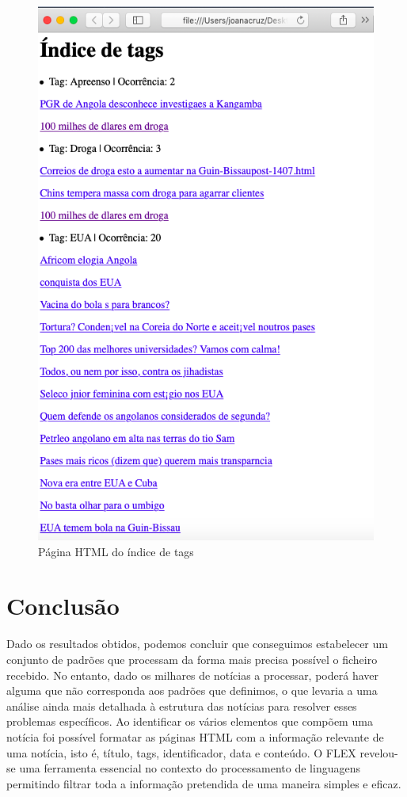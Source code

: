 \documentclass[25pt]{article}
\begin{document}
    \begin{figure}
    \centering\includegraphics[scale=0.50]{tagsHTML}
    \caption{\label{fig:controller}Página HTML do índice de tags}
    \end{figure}

    \newpage
    \newpage

    \section{Conclusão} 
    Dado os resultados obtidos, podemos concluir que conseguimos estabelecer um conjunto
    de padrões que processam da forma mais precisa possível o ficheiro recebido. No entanto, dado
    os milhares de notícias a processar, poderá haver alguma que não corresponda aos padrões que definimos, o que levaria
    a uma análise ainda mais detalhada à estrutura das notícias para resolver esses problemas específicos.
    Ao identificar os vários elementos que compõem uma notícia foi possível formatar as páginas HTML com a informação
    relevante de uma notícia, isto é, título, tags, identificador, data e conteúdo.
    O FLEX revelou-se uma ferramenta essencial no contexto do processamento de linguagens permitindo filtrar toda a informação
    pretendida de uma maneira simples e eficaz.
\end{document}
